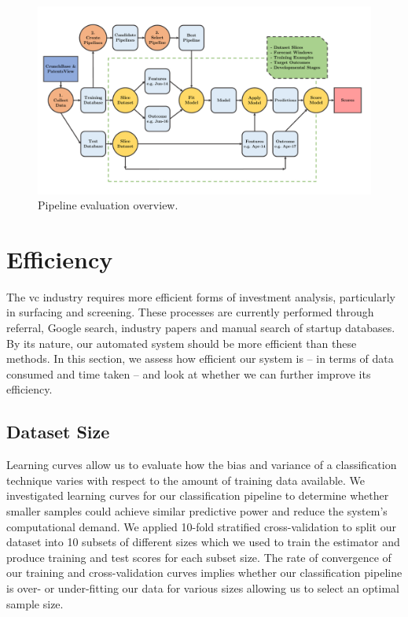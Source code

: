 \documentclass[../thesis/thesis.tex]{subfiles}
\begin{document}
\begin{figure}[!htb]
    \centering
    \includegraphics[width=\textwidth]{../figures/evaluation/flowchart_evaluation}
    \caption[Pipeline evaluation flowchart]{Pipeline evaluation overview.}
    \label{fig:evaluation:pipeline_evaluation}
\end{figure}

\section{Efficiency}

The \gls{vc} industry requires more efficient forms of investment analysis, particularly in surfacing and screening. These processes are currently performed through referral, Google search, industry papers and manual search of startup databases. By its nature, our automated system should be more efficient than these methods. In this section, we assess how efficient our system is -- in terms of data consumed and time taken -- and look at whether we can further improve its efficiency.

\subsection{Dataset Size}

Learning curves allow us to evaluate how the bias and variance of a classification technique varies with respect to the amount of training data available. We investigated learning curves for our classification pipeline to determine whether smaller samples could achieve similar predictive power and reduce the system's computational demand. We applied 10-fold stratified cross-validation to split our dataset into 10 subsets of different sizes which we used to train the estimator and produce training and test scores for each subset size. The rate of convergence of our training and cross-validation curves implies whether our classification pipeline is over- or under-fitting our data for various sizes allowing us to select an optimal sample size.
\end{document}
